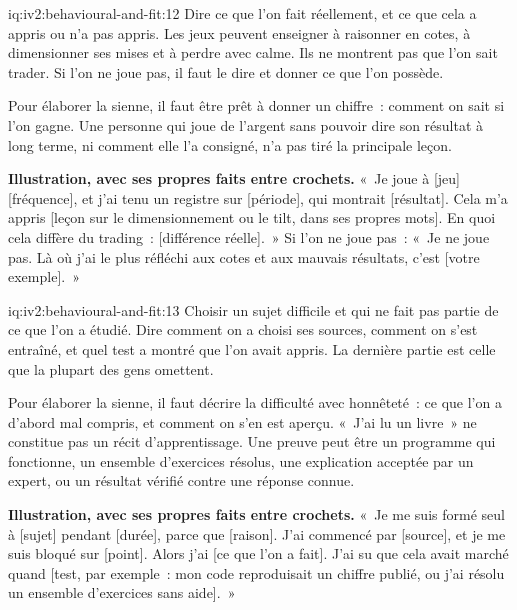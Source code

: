 \begin{solution}{iq:iv2:behavioural-and-fit:12}
Dire ce que l'on fait réellement, et ce que cela a appris ou n'a pas appris. Les jeux peuvent enseigner à raisonner en cotes, à dimensionner ses mises et à perdre avec calme. Ils ne montrent pas que l'on sait trader. Si l'on ne joue pas, il faut le dire et donner ce que l'on possède.

Pour élaborer la sienne, il faut être prêt à donner un chiffre~: comment on sait si l'on gagne. Une personne qui joue de l'argent sans pouvoir dire son résultat à long terme, ni comment elle l'a consigné, n'a pas tiré la principale leçon.

\textbf{Illustration, avec ses propres faits entre crochets.} «~Je joue à [jeu] [fréquence], et j'ai tenu un registre sur [période], qui montrait [résultat]. Cela m'a appris [leçon sur le dimensionnement ou le tilt, dans ses propres mots]. En quoi cela diffère du trading~: [différence réelle].~» Si l'on ne joue pas~: «~Je ne joue pas. Là où j'ai le plus réfléchi aux cotes et aux mauvais résultats, c'est [votre exemple].~»

\end{solution}

\begin{solution}{iq:iv2:behavioural-and-fit:13}
Choisir un sujet difficile et qui ne fait pas partie de ce que l'on a étudié. Dire comment on a choisi ses sources, comment on s'est entraîné, et quel test a montré que l'on avait appris. La dernière partie est celle que la plupart des gens omettent.

Pour élaborer la sienne, il faut décrire la difficulté avec honnêteté~: ce que l'on a d'abord mal compris, et comment on s'en est aperçu. «~J'ai lu un livre~» ne constitue pas un récit d'apprentissage. Une preuve peut être un programme qui fonctionne, un ensemble d'exercices résolus, une explication acceptée par un expert, ou un résultat vérifié contre une réponse connue.

\textbf{Illustration, avec ses propres faits entre crochets.} «~Je me suis formé seul à [sujet] pendant [durée], parce que [raison]. J'ai commencé par [source], et je me suis bloqué sur [point]. Alors j'ai [ce que l'on a fait]. J'ai su que cela avait marché quand [test, par exemple~: mon code reproduisait un chiffre publié, ou j'ai résolu un ensemble d'exercices sans aide].~»

\end{solution}

